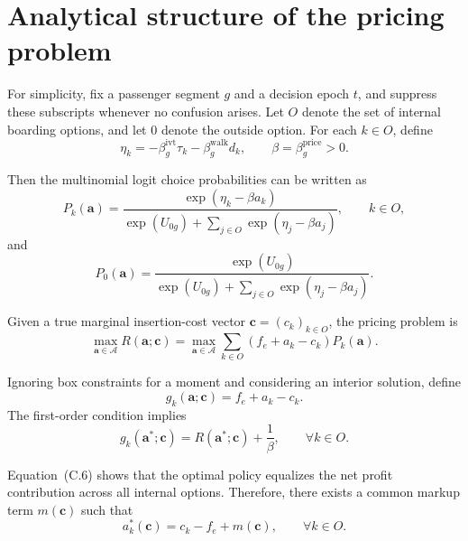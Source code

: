\documentclass[preprint,12pt,authoryear]{elsarticle}
\begin{document}
\section{Analytical structure of the pricing problem}
\label{app:pricing}

For simplicity, fix a passenger segment $g$ and a decision epoch $t$, and suppress these subscripts whenever no confusion arises. Let $O$ denote the set of internal boarding options, and let $0$ denote the outside option. For each $k\in O$, define
\begin{equation}
\eta_k = -\beta_g^{\mathrm{ivt}}\tau_k - \beta_g^{\mathrm{walk}} d_k,
\qquad
\beta = \beta_g^{\mathrm{price}} > 0.
\tag{C.1}
\end{equation}

Then the multinomial logit choice probabilities can be written as
\begin{equation}
P_k(\mathbf{a}) =
\frac{\exp(\eta_k-\beta a_k)}
{\exp(U_{0g}) + \sum_{j\in O}\exp(\eta_j-\beta a_j)},
\qquad k\in O,
\tag{C.2}
\end{equation}
and
\begin{equation}
P_0(\mathbf{a}) =
\frac{\exp(U_{0g})}
{\exp(U_{0g}) + \sum_{j\in O}\exp(\eta_j-\beta a_j)}.
\tag{C.3}
\end{equation}

Given a true marginal insertion-cost vector $\mathbf{c}=(c_k)_{k\in O}$, the pricing problem is
\begin{equation}
\max_{\mathbf{a}\in\mathcal{A}} R(\mathbf{a};\mathbf{c})
=
\max_{\mathbf{a}\in\mathcal{A}} \sum_{k\in O}(f_e+a_k-c_k)P_k(\mathbf{a}).
\tag{C.4}
\end{equation}

Ignoring box constraints for a moment and considering an interior solution, define
\begin{equation}
g_k(\mathbf{a};\mathbf{c}) = f_e+a_k-c_k.
\tag{C.5}
\end{equation}
The first-order condition implies
\begin{equation}
g_k(\mathbf{a}^{*};\mathbf{c}) = R(\mathbf{a}^{*};\mathbf{c}) + \frac{1}{\beta},
\qquad \forall k\in O.
\tag{C.6}
\end{equation}

Equation~(C.6) shows that the optimal policy equalizes the net profit contribution across all internal options. Therefore, there exists a common markup term $m(\mathbf{c})$ such that
\begin{equation}
a_k^{*}(\mathbf{c}) = c_k - f_e + m(\mathbf{c}),
\qquad \forall k\in O.
\tag{C.7}
\end{equation}
\end{document}
